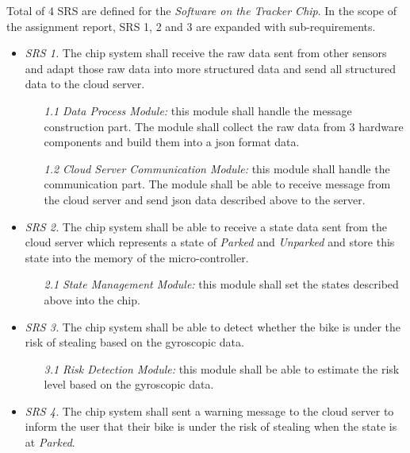\documentclass[transmag, conference, onecolumn]{IEEEtran}
\begin{document}
Total of 4 SRS are defined for the \textit{Software on the Tracker Chip}.
In the scope of the assignment report, SRS 1, 2 and 3 are expanded with sub-requirements.

\begin{itemize}
	\item \textit{SRS 1.} The chip system shall receive the raw data sent from other sensors and adapt those raw data
	      into more structured data and send all structured data to the cloud server.
	      \begin{itemize}
		      \item [\textit{1.1}] \textit{Data Process Module:} this module shall handle the message construction part.
		            The module shall collect the raw data from 3 hardware components
		            and build them into a json format data.
		      \item [\textit{1.2}] \textit{Cloud Server Communication Module:} this module shall handle the communication part.
		            The module shall be able to receive message from the cloud server
		            and send json data described above to the server.
	      \end{itemize}

	\item \textit{SRS 2.} The chip system shall be able to receive a state data sent from the cloud server
	      which represents a state of \textit{Parked} and \textit{Unparked} and store this state into the memory of the micro-controller.
	      \begin{itemize}
		      \item [\textit{2.1}] \textit{State Management Module:} this module shall set the states described above into the chip.
	      \end{itemize}

	\item \textit{SRS 3.} The chip system shall be able to detect whether the bike is under the risk of stealing
	      based on the gyroscopic data.
	      \begin{itemize}
		      \item [\textit{3.1}] \textit{Risk Detection Module:} this module shall be able to estimate the risk level
		            based on the gyroscopic data.
	      \end{itemize}

	\item \textit{SRS 4.} The chip system shall sent a warning message to the cloud server to inform the user
	      that their bike is under the risk of stealing when the state is at \textit{Parked}.
\end{itemize}
\end{document}

